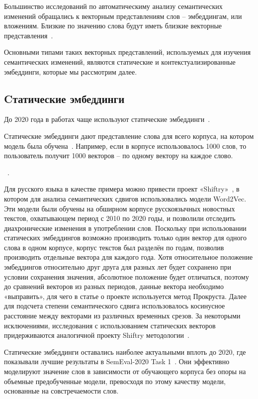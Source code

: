\documentclass[LI,VKR]{HSEUniversity}
\begin{document}
Большинство исследований по автоматическиму анализу семантических изменений обращались
к векторным представлениям слов – эмбеддингам, или вложениям.
Близкие по значению слова будут иметь близкие векторные
представления~\cite{Word2VecOriginal}.

Основными типами таких векторных представлений, используемых для изучения семантических изменений,
являются статические и контекстуализированные эмбеддинги,
которые мы рассмотрим далее.

\subsection{Cтатические эмбеддинги}

До 2020 года в работах чаще используют статические эмбеддинги~\cite{TahmasebiComputationalApproachesToSemanticChange}.

Статические эмбеддинги дают представление слова для всего корпуса,
на котором модель была обучена~\cite{TahmasebiComputationalApproachesToSemanticChange}.
Например, если в корпусе использовалось 1000 слов, то пользователь получит 1000 векторов –
по одному вектору на каждое слово.

~\cite{Word2VecModelAnalysis}.

Для русского языка в качестве примера можно привести проект «Shiftry»~\cite{shiftry},
в котором для анализа семантических сдвигов использовались модели Word2Vec.
Эти модели были обучены на обширном корпусе русскоязычных новостных текстов,
охватывающем период с 2010 по 2020 годы, и позволили отследить диахронические изменения
в употреблении слов.
Поскольку при использовании статических эмбеддингов возможно производить
только один вектор для одного слова в одном корпусе,
корпус текстов был разделён по годам,
позволив производить отдельные вектора для каждого года.
Хотя относительное положение эмбеддингов относительно друг друга для разных %
лет будет сохранено при условии сохранения значения, абсолютное положение будет отличаться,
поэтому до сравнений векторов из разных периодов, данные вектора необходимо «выправить»,
для чего в статье о проекте используется метод Прокруста.
Далее для подсчета степени семантического сдвига использовалось косинусное расстояние между
векторами из различных временных срезов.
За некоторыми исключениями, исследования с использованием статических векторов
придерживаются аналогичной проекту Shiftry методологии~\cite{TahmasebiComputationalApproachesToSemanticChange}.

Статические эмбеддинги оставались наиболее актуальными вплоть до 2020,
где показывали лучшие результаты в SemEval-2020 Task 1~\cite{semeval2020task}.
Они эффективно моделируют значение слов в зависимости от обучающего корпуса
без опоры на объемные предобученные модели,
превосходя по этому качеству модели, основанные на совстречаемости слов.
\end{document}
